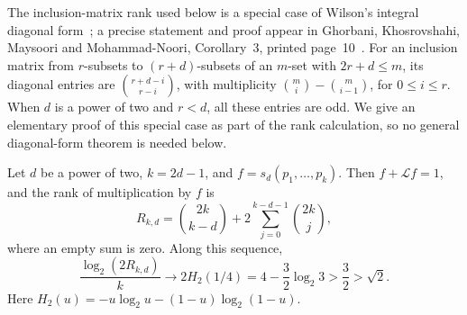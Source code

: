 The inclusion-matrix rank used below is a special case of Wilson's
integral diagonal form~\cite{Wilson1990}; a precise statement and proof
appear in Ghorbani, Khosrovshahi, Maysoori and Mohammad-Noori,
Corollary~3, printed page~10~\cite{Ghorbani2007}.
For an inclusion matrix from \(r\)-subsets to \((r+d)\)-subsets of an
\(m\)-set with \(2r+d\le m\), its diagonal entries are
\(\binom{r+d-i}{r-i}\), with multiplicity
\(\binom mi-\binom m{i-1}\), for \(0\le i\le r\).
When \(d\) is a power of two and \(r<d\), all these entries are odd.
We give an elementary proof of this special case as part of the rank
calculation, so no general diagonal-form theorem is needed below.

\begin{proposition}
\label{prop:elementary-pair-rank}
Let \(d\) be a power of two, \(k=2d-1\), and \(f=s_d(p_1,\ldots,p_k)\).
Then \(f+\mathcal Lf=1\), and the rank of multiplication by \(f\) is
\begin{equation}\label{eq:elementary-pair-rank}
 R_{k,d}=\binom{2k}{k-d}
          +2\sum_{j=0}^{k-d-1}\binom{2k}{j},
\end{equation}
where an empty sum is zero. Along this sequence,
\[
 \frac{\log_2(2R_{k,d})}{k}
 \longrightarrow 2H_2(1/4)
 =4-\frac32\log_2 3>\frac32>\sqrt2.
\]
Here \(H_2(u)=-u\log_2u-(1-u)\log_2(1-u)\).
\end{proposition}
